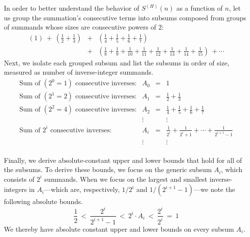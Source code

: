 In order to better understand the behavior of $S^{(H)}(n)$ as a
function of $n$, let us group the summation's consecutive terms into
subsums composed from groups of summands whose sizes are consecutive
powers of $2$:
\begin{eqnarray*}
\left( 1 \right) \ + \ \left( \frac{1}{2} + \frac{1}{3} \right)
 & + & \left( \frac{1}{4} + \frac{1}{5} + \frac{1}{6} + \frac{1}{7} \right) \\
 & + & \left( \frac{1}{8} +\frac{1}{9} + \frac{1}{10} + \frac{1}{11}
       + \frac{1}{12} + \frac{1}{13} + \frac{1}{14} + \frac{1}{15} \right) \ + \cdots
\end{eqnarray*}
Next, we isolate each grouped subsum and list the subsums in order of
size, measured as number of inverse-integer summands.
\[ \begin{array}{llcl}
\mbox{Sum of $(2^0 =1)$ consecutive inverses:} &
A_0 & = &  {\displaystyle 1 } \\
\mbox{Sum of $(2^1 =2)$ consecutive inverses:} &
A_1 & = &  {\displaystyle \frac{1}{2} + \frac{1}{3} }  \\
\mbox{Sum of $(2^2 =4)$ consecutive inverses:} &
A_2 & = &  {\displaystyle \frac{1}{4} + \frac{1}{5} + \frac{1}{6} + \frac{1}{7} } \\
 & \vdots & & \vdots \\
\mbox{Sum of $2^i$ consecutive inverses:} &
A_i & = &  {\displaystyle \frac{1}{2^i} + \frac{1}{2^i+1} + \cdots +
     \frac{1}{2^{i+1}-1}  } \\
 & \vdots & & \vdots \\
\end{array}
\]

Finally, we derive absolute-constant upper and lower bounds that hold
for all of the subsums.  To derive these bounds, we focus on the
generic subsum $A_i$, which consists of $2^i$ summands.  When we focus
on the largest and smallest inverse-integers in $A_i$---which are,
respectively, $1/2^i$ and $1/(2^{i+1}-1)$---we note the following
absolute bounds.
\[
\frac{1}{2}
 \ < \
\frac{2^i}{2^{i+1}-1}
 \ < \
2^i \cdot A_i
  \ < \
\frac{2^i}{2^i}
  \ = \ 1
\]
We thereby have absolute constant upper and lower bounds on every 
subsum $A_i$.

